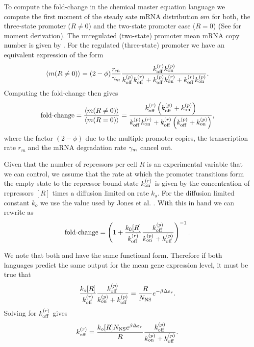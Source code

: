To compute the fold-change in the chemical master equation language we compute
the first moment of the steady sate mRNA distribution $\ee{m}$ for both, the
three-state promoter ($R \neq 0$) and the two-state promoter case ($R=0$) (See
 for moment derivation). The unregulated (two-state)
promoter mean mRNA copy number is given by . For
the regulated (three-state) promoter we have an equivalent expression of the
form
\begin{equation}
  \left\langle m (R \neq 0) \right\rangle = (2 - \phi){r_m \over \gamma _m} {k^{(r)}_{\text{off}}k^{(p)}_{\text{on}}
  \over k^{(p)}_{\text{off}}k^{(r)}_{\text{off}} + k^{(p)}_{\text{off}}k^{(r)}_{\text{on}} + k^{(r)}_{\text{off}}k^{(p)}_{\text{on}}}.
\end{equation}
Computing the fold-change then gives
\begin{equation}
  \text{fold-change} = {\left\langle m (R \neq 0) \right\rangle \over \left\langle m (R = 0) \right\rangle} =
  {k^{(r)}_{\text{off}} \left( k^{(p)}_{\text{off}} + k^{(p)}_{\text{on}} \right) \over
  k^{(p)}_{\text{off}}k^{(r)}_{\text{on}} + k^{(r)}_{\text{off}} \left( k^{(p)}_{\text{off}} + k^{(p)}_{\text{on}} \right)},
  \label{seq_fold_change_cme}
\end{equation}
where the factor $(2 - \phi)$ due to the multiple promoter copies, the
transcription rate $r_m$ and the mRNA degradation rate $\gamma _m$ cancel out.

Given that the number of repressors per cell $R$ is an experimental variable
that we can control, we assume that the rate at which the promoter transitions
form the empty state to the repressor bound state $k^{(r)}_{\text{on}}$ is given by the
concentration of repressors $[R]$ times a diffusion limited on rate $k_o$. For
the diffusion limited constant $k_o$ we use the value used by Jones et al.
\cite{Jones2014a}. With this in hand we can rewrite 
as
\begin{equation}
  \text{fold-change} = \left( 1 + {k_0 [R] \over k^{(r)}_{\text{off}}}
                {k^{(p)}_{\text{off}} \over k^{(p)}_{\text{on}} + k^{(p)}_{\text{off}}} \right)^{-1}.
  \label{seq_fc_kinetic}
\end{equation}

We note that both  and  have the same
functional form. Therefore if both languages predict the same output for the
mean gene expression level, it must be true that
\begin{equation}
  {k_o [R] \over k^{(r)}_{\text{off}}}{k^{(p)}_{\text{off}}\over k^{(p)}_{\text{on}}+ k^{(p)}_{\text{off}}} =
  {R \over N_\text{NS}} e^{-\beta\Delta\varepsilon_r}.
\end{equation}
Solving for $k^{(r)}_{\text{off}}$ gives
\begin{equation}
  k^{(r)}_{\text{off}} = {k_o [R] N_\text{NS} e^{\beta\Delta\varepsilon_r} \over R}{k^{(p)}_{\text{off}} \over k^{(p)}_{\text{on}} + k^{(p)}_{\text{off}}}.
  \label{seq_kroff_complete}
\end{equation}

